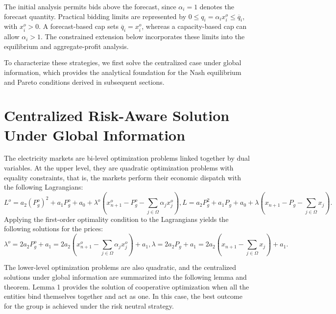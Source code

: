 \documentclass[journal]{IEEEtran}
\begin{document}
The initial analysis permits bids above the forecast, since $\alpha_i=1$ denotes the forecast quantity. Practical bidding limits are represented by $0\le q_i=\alpha_i x_i^o\le\overline q_i$, with $x_i^o>0$. A forecast-based cap sets $\overline q_i=x_i^o$, whereas a capacity-based cap can allow $\alpha_i>1$. The constrained extension below incorporates these limits into the equilibrium and aggregate-profit analysis.

To characterize these strategies, we first solve the centralized case under global information, which provides the analytical foundation for the Nash equilibrium and Pareto conditions derived in subsequent sections.

\section{Centralized Risk-Aware Solution Under Global Information}

The electricity markets are bi-level optimization problems linked together by dual variables. At the upper level, they are quadratic optimization problems with equality constraints, that is, the markets perform their economic dispatch with the following Lagrangians: 
\begin{subequations}
\begin{equation} 
L^o = a_2(P_g^o)^2+a_1P_g^o+a_0 + \lambda^o\left(x_{n+1}^o- P_g^o-\sum_{j\in\Omega} \alpha_j x_j^o \right), \label{eq:L*}
\end{equation}
\begin{equation} 
L = a_2P_g^2+a_1P_g+a_0 + \lambda\left(x_{n+1}-P_g-\sum_{j\in\Omega} x_j\right). \label{eq:L}
\end{equation}
\end{subequations}
Applying the first-order optimality condition to the Lagrangians yields the following solutions for the prices:
\begin{subequations}
\begin{equation} 
\lambda^o = 2a_2P_g^o +a_1 = 2a_2\left(x_{n+1}^o-\sum_{j\in\Omega} \alpha_j x_j^o \right) +a_1 , \label{eq:lambda*}
\end{equation}
\begin{equation} 
\lambda = 2a_2P_g+a_1=2a_2\left(x_{n+1}-\sum_{j\in\Omega} x_j \right) + a_1. \label{eq:lambda}
\end{equation}
\end{subequations}

The lower-level optimization problems are also quadratic, and the centralized solutions under global information are summarized into the following lemma and theorem. Lemma 1 provides the solution of cooperative optimization when all the entities bind themselves together and act as one. In this case, the best outcome for the group is achieved under the risk neutral strategy.
\end{document}
